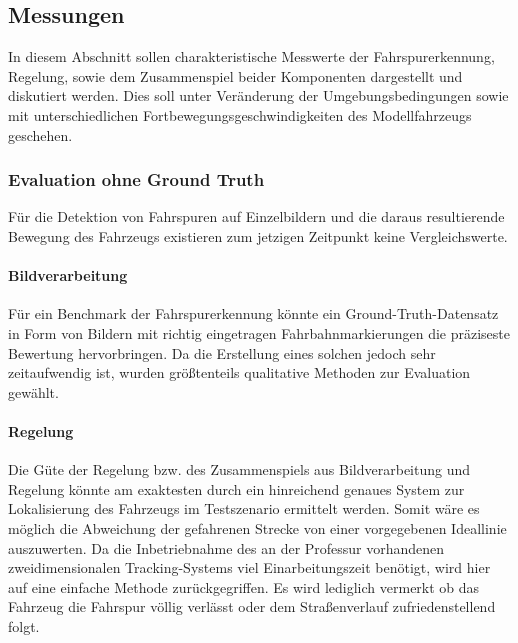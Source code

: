 \subsection{Messungen}
In diesem Abschnitt sollen charakteristische Messwerte der Fahrspurerkennung, Regelung, sowie dem Zusammenspiel beider Komponenten dargestellt und diskutiert werden. Dies soll unter Veränderung der Umgebungsbedingungen sowie mit unterschiedlichen Fortbewegungsgeschwindigkeiten des Modellfahrzeugs geschehen.
  
\subsubsection{Evaluation ohne Ground Truth}
Für die Detektion von Fahrspuren auf Einzelbildern und die daraus resultierende Bewegung des Fahrzeugs existieren zum jetzigen Zeitpunkt keine Vergleichswerte. 

\paragraph{Bildverarbeitung} 
Für ein Benchmark der Fahrspurerkennung könnte ein Ground-Truth-Datensatz in Form von Bildern mit richtig eingetragen Fahrbahnmarkierungen die präziseste Bewertung hervorbringen. Da die Erstellung eines solchen jedoch sehr zeitaufwendig ist, wurden größtenteils qualitative Methoden zur Evaluation gewählt.



\paragraph{Regelung} 
Die Güte der Regelung bzw. des Zusammenspiels aus Bildverarbeitung und Regelung könnte am exaktesten durch ein hinreichend genaues System zur Lokalisierung des Fahrzeugs im Testszenario ermittelt werden. Somit wäre es möglich die Abweichung der gefahrenen Strecke von einer vorgegebenen Ideallinie auszuwerten. Da die Inbetriebnahme des an der Professur vorhandenen zweidimensionalen Tracking-Systems viel Einarbeitungszeit benötigt, wird hier auf eine einfache Methode zurückgegriffen. Es wird lediglich vermerkt ob das Fahrzeug die Fahrspur völlig verlässt oder dem Straßenverlauf zufriedenstellend folgt.


